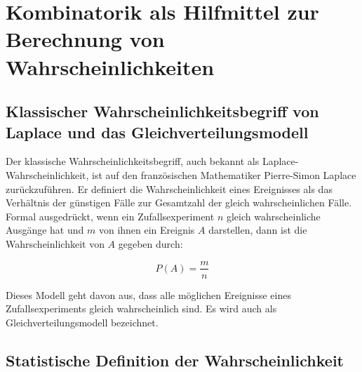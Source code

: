 
\section{Kombinatorik als Hilfmittel zur Berechnung von Wahrscheinlichkeiten}

\subsection{Klassischer Wahrscheinlichkeitsbegriff von Laplace und das Gleichverteilungsmodell}

Der klassische Wahrscheinlichkeitsbegriff, auch bekannt als Laplace-Wahrscheinlichkeit, ist auf den französischen Mathematiker Pierre-Simon Laplace zurückzuführen.
Er definiert die Wahrscheinlichkeit eines Ereignisses als das Verhältnis der günstigen Fälle zur Gesamtzahl der gleich wahrscheinlichen Fälle.
Formal ausgedrückt, wenn ein Zufallsexperiment $n$ gleich wahrscheinliche Ausgänge hat und $m$ von ihnen ein Ereignis $A$ darstellen, dann ist die Wahrscheinlichkeit von $A$ gegeben durch:

\begin{equation}
    P(A) = \frac{m}{n}
\end{equation}

Dieses Modell geht davon aus, dass alle möglichen Ereignisse eines Zufallsexperiments gleich wahrscheinlich sind.
Es wird auch als Gleichverteilungsmodell bezeichnet.

\subsection{Statistische Definition der Wahrscheinlichkeit}

